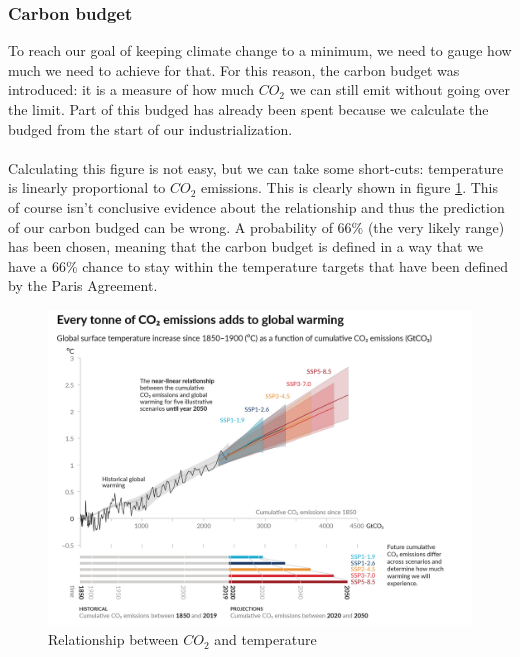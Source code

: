 \documentclass[../summary.tex]{subfiles}
\begin{document}
			\subsubsection{Carbon budget}
				To reach our goal of keeping climate change to a minimum, we need to gauge how much we need to achieve for that. For this reason, the carbon budget was introduced: it is a measure of how much $CO_2$ we can still emit without going over the limit. Part of this budged has already been spent because we calculate the budged from the start of our industrialization. \\
				\\
				Calculating this figure is not easy, but we can take some short-cuts: temperature is linearly proportional to $CO_2$ emissions. This is clearly shown in figure \ref{fig:1-co2-temp}. This of course isn't conclusive evidence about the relationship and thus the prediction of our carbon budged can be wrong. A probability of 66\% (the very likely range) has been chosen, meaning that the carbon budget is defined in a way that we have a 66\% chance to stay within the temperature targets that have been defined by the Paris Agreement.
				\begin{figure}[h]
					\centering
					\includegraphics[width=0.7\linewidth]{../images/1-co2-temp.png}
					\caption{Relationship between $CO_2$ and temperature}
					\label{fig:1-co2-temp}
				\end{figure}
				
\end{document}
